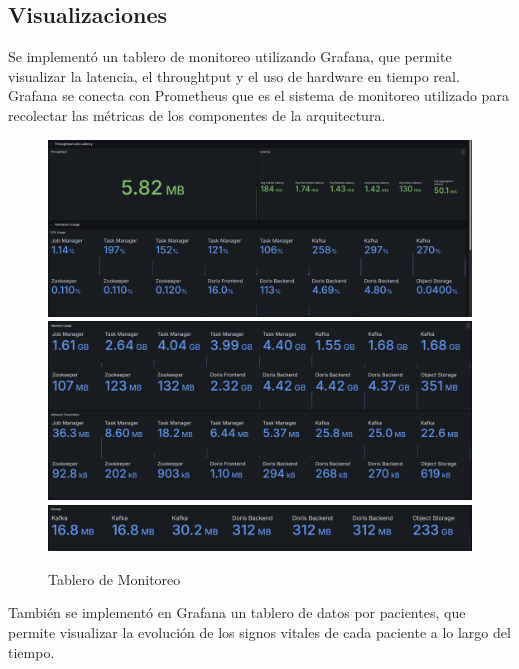 \newpage

\subsection{Visualizaciones}

Se implementó un tablero de monitoreo utilizando Grafana, que permite visualizar la latencia, el throughtput y el uso de hardware en tiempo real.
Grafana se conecta con Prometheus que es el sistema de monitoreo utilizado para recolectar las métricas de los componentes de la arquitectura.

\begin{figure}[h]
    \centering
    \includegraphics[width=1\textwidth]{desarrollo/monitoring1.png}
    \includegraphics[width=1\textwidth]{desarrollo/monitoring2.png}
    \includegraphics[width=1\textwidth]{desarrollo/monitoring3.png}
    \caption{Tablero de Monitoreo}
    \label{fig:monitoring}
\end{figure}
\clearpage

También se implementó en Grafana un tablero de datos por pacientes, que permite visualizar la evolución de los signos vitales de cada paciente a lo largo del tiempo.


